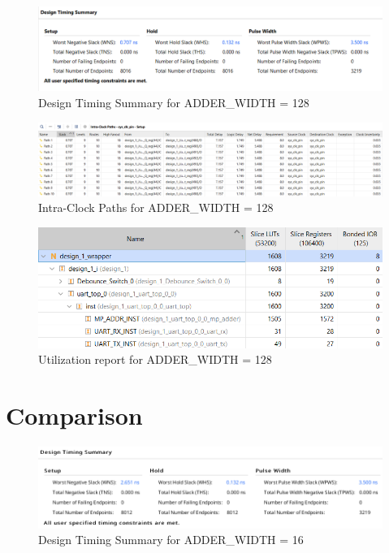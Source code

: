 \documentclass[a4paper,kul]{kulakarticle} %
\begin{document}
\begin{figure}[h]
	\centering
	\includegraphics[width=0.75\linewidth]{images/timing-128-bit.png}
	\caption{Design Timing Summary for ADDER\_WIDTH = 128}
	\label{fig:timing-128-bit}
\end{figure}

\begin{figure}[h]
	\centering
	\includegraphics[width=0.75\linewidth]{images/paths-128-bit.png}
	\caption{Intra-Clock Paths for ADDER\_WIDTH = 128}
	\label{fig:paths-128-bit}
\end{figure}

\begin{figure}[h]
	\centering
	\includegraphics[width=0.75\linewidth]{images/utilization-128-bit.png}
	\caption{Utilization report for ADDER\_WIDTH = 128}
	\label{fig:utilization-128-bit}
\end{figure}

\section{Comparison }


\begin{figure}[h]
	\centering
	\includegraphics[width=0.75\linewidth]{images/timing-16-bit.png}
	\caption{Design Timing Summary for ADDER\_WIDTH = 16}
	\label{fig:timing-16-bit}
\end{figure}
\end{document}
